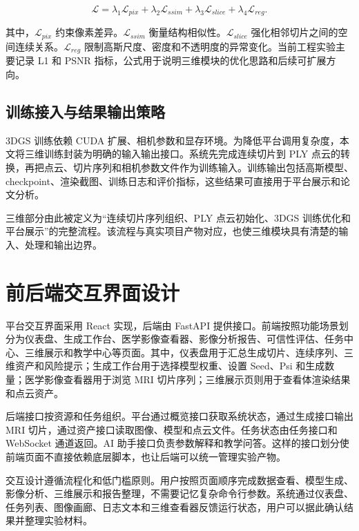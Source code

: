 \begin{equation}
\mathcal{L} = \lambda_1 \mathcal{L}_{pix} + \lambda_2 \mathcal{L}_{ssim} + \lambda_3 \mathcal{L}_{slice} + \lambda_4 \mathcal{L}_{reg}.
\end{equation}

其中，$\mathcal{L}_{pix}$ 约束像素差异。$\mathcal{L}_{ssim}$ 衡量结构相似性。$\mathcal{L}_{slice}$ 强化相邻切片之间的空间连续关系。$\mathcal{L}_{reg}$ 限制高斯尺度、密度和不透明度的异常变化。当前工程实验主要记录 L1 和 PSNR 指标，公式用于说明三维模块的优化思路和后续可扩展方向。

\subsection{训练接入与结果输出策略}
3DGS 训练依赖 CUDA 扩展、相机参数和显存环境。为降低平台调用复杂度，本文将三维训练封装为明确的输入输出接口。系统先完成连续切片到 PLY 点云的转换，再把点云、切片序列和相机参数文件作为训练输入。训练输出包括高斯模型、checkpoint、渲染截图、训练日志和评价指标，这些结果可直接用于平台展示和论文分析。

三维部分由此被定义为“连续切片序列组织、PLY 点云初始化、3DGS 训练优化和平台展示”的完整流程。该流程与真实项目产物对应，也使三维模块具有清楚的输入、处理和输出边界。

\section{前后端交互界面设计}
平台交互界面采用 React 实现，后端由 FastAPI 提供接口。前端按照功能场景划分为仪表盘、生成工作台、医学影像查看器、影像分析报告、可信性评估、任务中心、三维展示和教学中心等页面。其中，仪表盘用于汇总生成切片、连续序列、三维资产和风险提示；生成工作台用于选择模型权重、设置 Seed、Psi 和生成数量；医学影像查看器用于浏览 MRI 切片序列；三维展示页则用于查看体渲染结果和点云资产。

后端接口按资源和任务组织。平台通过概览接口获取系统状态，通过生成接口输出 MRI 切片，通过资产接口读取图像、模型和点云文件。任务状态由任务接口和 WebSocket 通道返回。AI 助手接口负责参数解释和教学问答。这样的接口划分使前端页面不直接依赖底层脚本，也让后端可以统一管理实验产物。

交互设计遵循流程化和低门槛原则。用户按照页面顺序完成数据查看、模型生成、影像分析、三维展示和报告整理，不需要记忆复杂命令行参数。系统通过仪表盘、任务列表、图像画廊、日志文本和三维查看器反馈运行状态，用户可以据此确认结果并整理实验材料。
